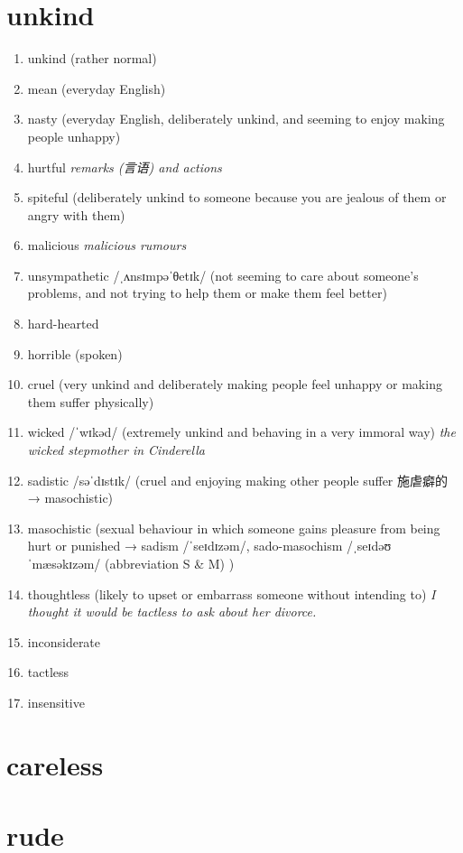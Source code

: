 \section{unkind}
\begin{enumerate}
    \item unkind (rather normal)
    \item mean (everyday English)
    \item nasty (everyday English, deliberately unkind, and seeming to enjoy making people unhappy)
    \item hurtful \textit{remarks (言语) and actions}
    \item spiteful (deliberately unkind to someone because you are jealous of them or angry with them)
    \item malicious \textit{malicious rumours}
    \item unsympathetic /ˌʌnsɪmpəˈθetɪk/ (not seeming to care about someone's problems, and not trying to help them or make them feel better)
    \item hard-hearted
    \item horrible (spoken)
    \item cruel (very unkind and deliberately making people feel unhappy or making them suffer physically)
    \item wicked /ˈwɪkəd/ (extremely unkind and behaving in a very immoral way) \textit{the wicked stepmother in Cinderella}
    \item sadistic /səˈdɪstɪk/ (cruel and enjoying making other people suffer 施虐癖的 → masochistic)
    \item masochistic (sexual behaviour in which someone gains pleasure from being hurt or punished → sadism /ˈseɪdɪzəm/, sado-masochism /ˌseɪdəʊˈmæsəkɪzəm/ (abbreviation S \& M) )
    \item thoughtless (likely to upset or embarrass someone without intending to) \textit{I thought it would be tactless to ask about her divorce.}
    \item inconsiderate
    \item tactless
    \item insensitive
\end{enumerate}

\section{careless}

\section{rude}